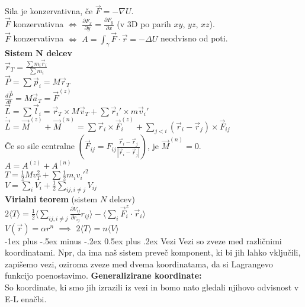\documentclass[12pt,landscape]{article}
\makeatletter
\renewcommand{\section}{\@startsection{section}{1}{0mm}%
                                {-1ex plus -.5ex minus -.2ex}%
                                {0.5ex plus .2ex}%
                                {\normalfont\large\bfseries}}
\newcommand{\avg}[1]{\langle#1\rangle}
\newcommand{\rv}{\vec{r}}
\newcommand{\vv}{\vec{v}}
\newcommand{\av}{\vec{a}}
\newcommand{\F}{\vec{F}}
\makeatother
\begin{document}
\begin{multicols}{3}
Sila je konzervativna, če $\F = - \nabla U$. \\
$\F$ konzervativna $\iff$ $\frac{\partial F_x}{\partial y} = \frac{\partial F_y}{\partial x}$ (v 3D po parih $xy$, $yz$, $xz$). \\ 
$\F$ konzervativna $\iff$ $A = \int_\gamma \F \cdot \rv = - \Delta U$ neodvisno od poti. \medskip \\

\textbf{Sistem $\mathbf{N}$ delcev} \\
$\rv_T = \frac{\sum m_i \rv_i}{\sum m_i}$ \\
$\vec P = \sum \vec p_i = M \rv_T$ \\
$\frac{d \vec P}{dt} = M \av_T = \F^{(z)}$ \smallskip \\

$\vec L = \sum \vec l_i = \rv_T \times M \vv_T + \sum \rv_i' \times m \vv_i'$ \\
$\dot{\vec L} = \vec M^{(z)} + \vec M^{(n)} = \sum \rv_i \times \F_i^{(z)} + \sum_{j < i} (\rv_i - \rv_j) \times \F_{ij}$ \\
Če so sile centralne $\left( \F_{ij} = F_{ij} \frac{\rv_i - \rv_j}{|\rv_i - \rv_j|} \right)$, je $\vec M^{(n)} = 0$.\smallskip \\

$A = A^{(z)} + A^{(n)}$ \\
$T = \frac{1}{2} M v_T^2 + \sum \frac{1}{2} m_i v_i'^2$ \\
$V = \sum_i V_i + \frac{1}{2} \sum_{ij, i \neq j} V_{ij}$\medskip \\

\textbf{Virialni teorem} (sistem $N$ delcev) \\
$2 \avg T = \frac{1}{2} \avg{\sum_{ij, i \neq j} \frac{\partial V_{ij}}{\partial r_{ij}} r_{ij}} - \avg{\sum_i \F_i^{z} \cdot \rv_i}$ \\
$V(\rv) = \alpha r^n$ \quad $\implies$ \quad $2 \avg{T} = n \avg{V}$ \medskip \\
\section{Vezi}
Vezi so zveze med različnimi koordinatami. Npr, da ima naš sistem preveč komponent, ki bi jih lahko vključili, zapišemo vezi, oziroma zveze med dvema koordinatama, da si Lagrangevo funkcijo poenostavimo. 
\textbf{Generalizirane koordinate:}\\
So koordinate, ki smo jih izrazili iz vezi in bomo nato gledali njihovo odvisnost v E-L enačbi.


\end{multicols}
\end{document}
